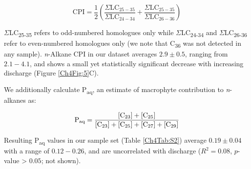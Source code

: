 \begin{equation}\label{Ch4Eq:2}
\text{CPI} = \frac{1}{2} \left( \frac{\Sigma \text{LC}_{25-35}}{\Sigma \text{LC}_{24-34}} + \frac{\Sigma \text{LC}_{25-35}}{\Sigma \text{LC}_{26-36}} \right)
\end{equation}

$\Sigma$LC\textsubscript{25-35} refers to odd-numbered homologues only while $\Sigma$LC\textsubscript{24-34} and $\Sigma$LC\textsubscript{26-36} refer to even-numbered homologues only (we note that C\textsubscript{36} was not detected in any sample). \textit{n}-Alkane CPI in our dataset averages $2.9 \pm 0.5$, ranging from $2.1 - 4.1$, and shows a small yet statistically significant decrease with increasing discharge (Figure \ref{Ch4Fig:5}C).

We additionally calculate P\textsubscript{aq}, an estimate of macrophyte contribution to \textit{n}-alkanes \citep{Ficken:2000wq} as:

\begin{equation}\label{Ch4Eq:3}
\text{P}_{\text{aq}} = \frac{[\ce{C}_{23}] + [\ce{C}_{25}]}{[\ce{C}_{23}] + [\ce{C}_{25}] + [\ce{C}_{27}] + [\ce{C}_{29}]}
\end{equation}

Resulting P\textsubscript{aq} values in our sample set (Table \ref{Ch4Tab:S2}) average $0.19 \pm 0.04$ with a range of $0.12 - 0.26$, and are uncorrelated with discharge ($R^2 = 0.08$, $p$-value > $0.05$; not shown).

